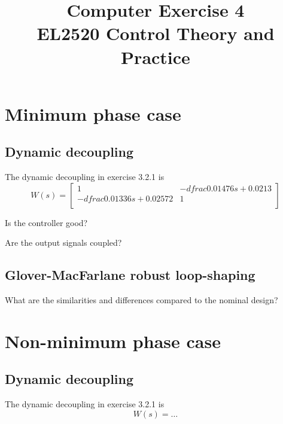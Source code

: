 \documentclass[a4paper,12pt,oneside,onecolumn]{article} %
\title{
	Computer Exercise 4\\
	EL2520 Control Theory and Practice
}
\author{
}
\newcommand{\image}[3][width=1.0\columnwidth]{
	\begin{figure}[h!]
		\centering
	    \texttt{[image: \#2]}
		\caption{#3}
		\label{fig:#2}
	\end{figure}
}
\newcommand{\imaget}[3][width=1.0\columnwidth]{
	\begin{figure}[H]
		\centering
      
		\caption{#3}
		\label{fig:#2}
	\end{figure}
}
\begin{document}
	\maketitle

	\section*{Minimum phase case}

	\subsection*{Dynamic decoupling}
	The dynamic decoupling in exercise 3.2.1 is
	\[
		W(s)=
    \begin{bmatrix}
      1                             & -dfrac{0.01476}{s + 0.0213} \\
      -dfrac{0.01336}{s + 0.02572}  & 1                           \\
    \end{bmatrix}
	\]


	Is the controller good?
	\par\dotfill\par\dotfill\par
	Are the output signals coupled?
	\par\dotfill\par\dotfill

	\subsection*{Glover-MacFarlane robust loop-shaping}


	What are the similarities and differences compared to the nominal design?
	\par\dotfill\par\dotfill

	\section*{Non-minimum phase case}

	\subsection*{Dynamic decoupling}
	The dynamic decoupling in exercise 3.2.1 is
	\[
		W(s) = \ldots
	\]
\end{document}
